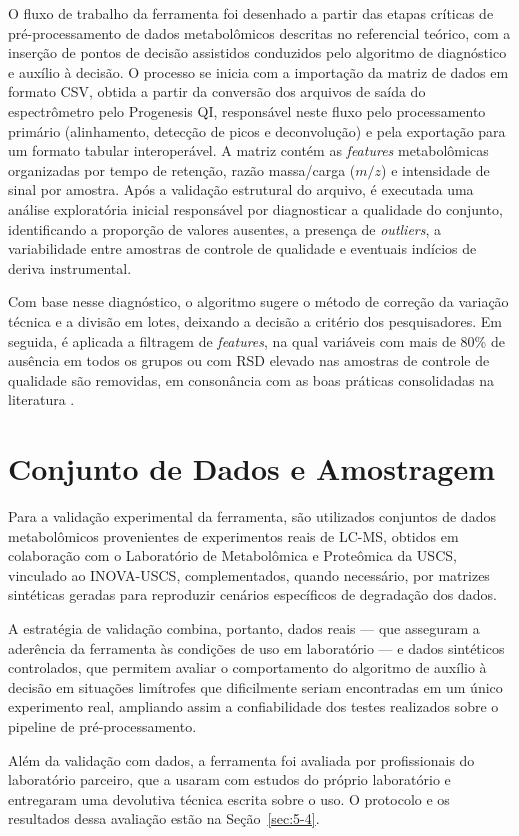 O fluxo de trabalho da ferramenta foi desenhado a partir das etapas críticas de pré-processamento de dados metabolômicos descritas no referencial teórico, com a inserção de pontos de decisão assistidos conduzidos pelo algoritmo de diagnóstico e auxílio à decisão. O processo se inicia com a importação da matriz de dados em formato CSV, obtida a partir da conversão dos arquivos de saída do espectrômetro pelo Progenesis QI, responsável neste fluxo pelo processamento primário (alinhamento, detecção de picos e deconvolução) e pela exportação para um formato tabular interoperável. A matriz contém as \textit{features} metabolômicas organizadas por tempo de retenção, razão massa/carga ($m/z$) e intensidade de sinal por amostra. Após a validação estrutural do arquivo, é executada uma análise exploratória inicial responsável por diagnosticar a qualidade do conjunto, identificando a proporção de valores ausentes, a presença de \textit{outliers}, a variabilidade entre amostras de controle de qualidade e eventuais indícios de deriva instrumental.
 
Com base nesse diagnóstico, o algoritmo sugere o método de correção da variação técnica e a divisão em lotes, deixando a decisão a critério dos pesquisadores. Em seguida, é aplicada a filtragem de \textit{features}, na qual variáveis com mais de 80\% de ausência em todos os grupos ou com RSD elevado nas amostras de controle de qualidade são removidas, em consonância com as boas práticas consolidadas na literatura \cite{broadhurst2018guidelines}.
 
\section{Conjunto de Dados e Amostragem}
 
Para a validação experimental da ferramenta, são utilizados conjuntos de dados metabolômicos provenientes de experimentos reais de LC-MS, obtidos em colaboração com o Laboratório de Metabolômica e Proteômica da USCS, vinculado ao INOVA-USCS, complementados, quando necessário, por matrizes sintéticas geradas para reproduzir cenários específicos de degradação dos dados.
  
A estratégia de validação combina, portanto, dados reais --- que asseguram a aderência da ferramenta às condições de uso em laboratório --- e dados sintéticos controlados, que permitem avaliar o comportamento do algoritmo de auxílio à decisão em situações limítrofes que dificilmente seriam encontradas em um único experimento real, ampliando assim a confiabilidade dos testes realizados sobre o pipeline de pré-processamento.

Além da validação com dados, a ferramenta foi avaliada por profissionais do laboratório parceiro, que a usaram com estudos do próprio laboratório e entregaram uma devolutiva técnica escrita sobre o uso. O protocolo e os resultados dessa avaliação estão na Seção~\ref{sec:5-4}.